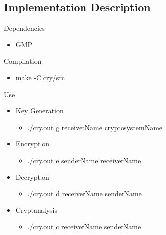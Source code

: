 \subsection{Implementation Description}


Dependencies
\begin{itemize}
  \item GMP
\end{itemize}

Compilation
\begin{itemize}
  \item make -C cry/src
\end{itemize}

Use
\begin{itemize}
  \item Key Generation
  \begin{itemize}
    \item ./cry.out g receiverName cryptosystemName
  \end{itemize}
  \item Encryption
  \begin{itemize}
    \item ./cry.out e senderName receiverName
  \end{itemize}
  \item Decryption
  \begin{itemize}
    \item ./cry.out d receiverName senderName
  \end{itemize}
  \item Cryptanalysis
  \begin{itemize}
    \item ./cry.out c receiverName senderName
  \end{itemize}
\end{itemize}
